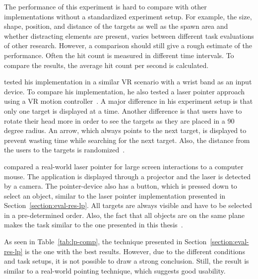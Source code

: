 The performance of this experiment is hard to compare with other implementations without a standardized experiment setup. For example, the size, shape, position, and distance of the targets as well as the spawn area and whether distracting elements are present, varies between different task evaluations of other research. However, a comparison should still give a rough estimate of the performance. Often the hit count is measured in different time intervals. To compare the results, the average hit count per second is calculated.

\citeauthor{Kamm.2018} tested his implementation in a similar \gls{VR} scenario with a wrist band as an input device. To compare his implementation, he also tested a laser pointer approach using a \gls{VR} motion controller~\cite[39]{Kamm.2018}. A major difference in his experiment setup is that only one target is displayed at a time. Another difference is that users have to rotate their head more in order to see the targets as they are placed in a 90 degree radius. An arrow, which always points to the next target, is displayed to prevent wasting time while searching for the next target. Also, the distance from the users to the targets is randomized~\cite[45]{Kamm.2018}.

\citeauthor{JiYoungOh.2002} compared a real-world laser pointer for large screen interactions to a computer mouse. The application is displayed through a projector and the laser is detected by a camera. The pointer-device also has a button, which is pressed down to select an object, similar to the laser pointer implementation presented in Section~\ref{section:eval-res-lp}. All targets are always visible and have to be selected in a pre-determined order. Also, the fact that all objects are on the same plane makes the task similar to the one presented in this thesis~\cite[3\psq]{JiYoungOh.2002}.

As seen in Table~\ref{tab:lp-comp}, the technique presented in Section~\ref{section:eval-res-lp} is the one with the best results. However, due to the different conditions and task setups, it is not possible to draw a strong conclusion. Still, the result is similar to a real-world pointing technique, which suggests good usability.

